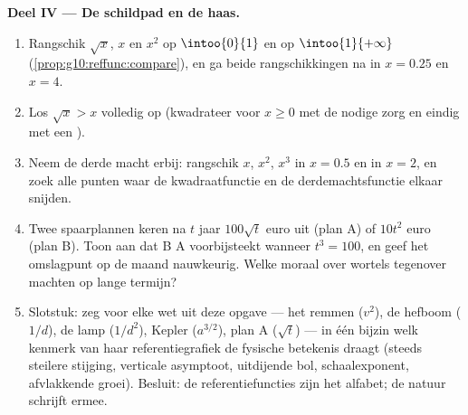 \begin{problem}
\medskip
\noindent\textbf{Deel IV --- De schildpad en de haas.}
\begin{enumerate}[resume]
  \item Rangschik $\sqrt x$, $x$ en $x^2$ op $\intoo{0}{1}$ en op
        $\intoo{1}{+\infty}$ (\cref{prop:g10:reffunc:compare}), en ga beide
        rangschikkingen na in $x = 0.25$ en $x = 4$.
  \item Los $\sqrt x > x$ volledig op (kwadrateer voor $x \geq 0$ met de
        nodige zorg en eindig met een ).
  \item Neem de derde macht erbij: rangschik $x$, $x^2$, $x^3$ in $x = 0.5$
        en in $x = 2$, en zoek alle punten waar de kwadraatfunctie en de
        derdemachtsfunctie elkaar snijden.
  \item Twee spaarplannen keren na $t$ jaar $100\sqrt t$ euro uit (plan A) of
        $10 t^2$ euro (plan B). Toon aan dat B A voorbijsteekt wanneer
        $t^3 = 100$, en geef het omslagpunt op de maand nauwkeurig. Welke
        moraal over wortels tegenover machten op lange termijn?
  \item Slotstuk: zeg voor elke wet uit deze opgave --- het remmen ($v^2$),
        de hefboom ($1/d$), de lamp ($1/d^2$), Kepler ($a^{3/2}$), plan A
        ($\sqrt t$) --- in één bijzin welk kenmerk van haar
        referentiegrafiek de fysische betekenis draagt (steeds steilere
        stijging, verticale asymptoot, uitdijende bol, schaalexponent,
        afvlakkende groei). Besluit: de referentiefuncties zijn het alfabet;
        de natuur schrijft ermee.
\end{enumerate}
\end{problem}
